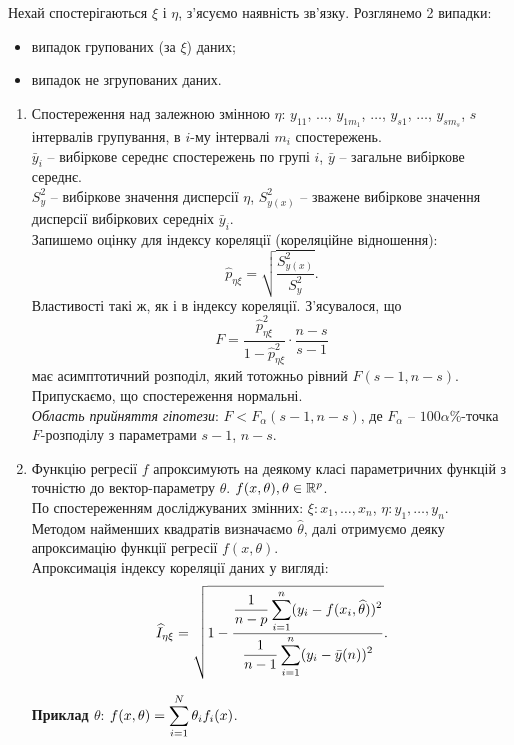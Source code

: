 Нехай спостерігаються $\xi$ і $\eta$, з'ясуємо наявність зв'язку. Розглянемо 2 випадки:
\begin{itemize}
	\item випадок групованих (за $\xi$) даних;
	\item випадок не згрупованих даних.
\end{itemize}

\begin{enumerate}
	\item Спостереження над залежною змінною $\eta$: $y_{11}$, $\ldots$, $y_{1m_1}$, $\ldots$, $y_{s1}$, $\ldots$, $y_{sm_s}$, $s$ інтервалів групування, в $i$-му інтервалі $m_i$ спостережень. \\

	$\bar{y}_i$ --  вибіркове середнє спостережень по групі $i$, $\bar{y}$ -- загальне вибіркове середнє. \\

	$S_y^2$ -- вибіркове значення дисперсії $\eta$, $S_{y(x)}^2$ -- зважене вибіркове значення дисперсії вибіркових середніх $\bar{y}_i$. \\

	Запишемо оцінку для індексу кореляції (кореляційне відношення): \[\widehat{p}_{\eta\xi}=\sqrt{\dfrac{S_{y(x)}^2}{S_y^2}}.\] Властивості такі ж, як і в індексу кореляції. З'ясувалося, що
	\[ F = \dfrac{\widehat{p}_{\eta\xi}^2}{1 - \widehat{p}_{\eta\xi}^2} \cdot \dfrac{n - s}{s - 1} \] має асимптотичний розподіл, який тотожньо рівний $F(s - 1, n - s)$. Припускаємо, що спостереження нормальні. \\

	\textit{Область прийняття гіпотези}: $F < F_\alpha(s - 1, n  -s)$, де $F_\alpha$ -- $100\alpha\%$-точка $F$-розподілу з параметрами $s - 1$, $n - s$.

	\item Функцію регресії $f$ апроксимують на деякому класі параметричних функцій з точністю до вектор-параметру $\theta$. $f (x,\theta),\theta \in\mathbb{R}^p$. \\

	По спостереженням досліджуваних змінних: $\xi: x_1, \ldots, x_n$, $\eta: y_1, \ldots, y_n$. \\

	Методом найменших квадратів визначаємо $\widehat{\theta}$, далі отримуємо деяку апроксимацію функції регресії $f (x,\theta)$. \\

	Апроксимація індексу кореляції даних у вигляді:
	\[ \widehat{I}_{\eta\xi} = \sqrt{1 - \dfrac{\dfrac{1}{n-p} \displaystyle\sum\limits_{i=1}^n (y_i - f(x_i, \widehat{\theta}))^2}{\dfrac{1}{n-1}\displaystyle\sum\limits_{i=1}^n (y_i-\bar{y}(n))^2}}. \]

	\textbf{Приклад $\theta$}: $f(x, \theta) = \displaystyle\sum\limits_{i=1}^N \theta_i f_i(x)$.
\end{enumerate}

